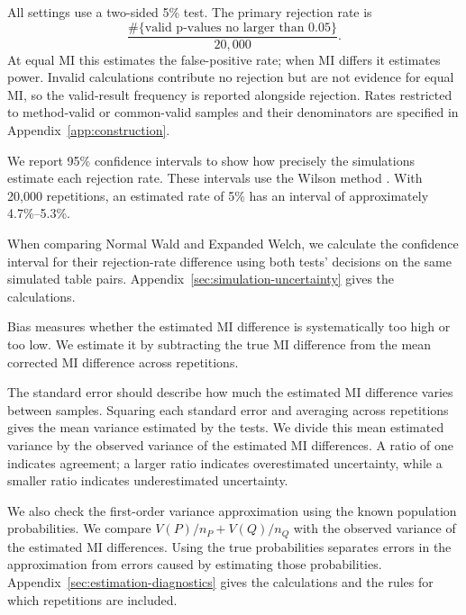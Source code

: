 All settings use a two-sided 5\% test. The primary rejection rate is
\begin{equation}
 \frac{\#\{\text{valid p-values no larger than }0.05\}}{20{,}000}.
 \label{eq:unconditional-rate}
\end{equation}
At equal MI this estimates the false-positive rate; when MI differs it
estimates power. Invalid calculations contribute no rejection but are not
evidence for equal MI, so the valid-result frequency is reported
alongside rejection. Rates restricted to method-valid or common-valid
samples and their denominators are specified in
Appendix~\ref{app:construction}.

We report 95\% confidence intervals to show how precisely the simulations
estimate each rejection rate. These intervals use the Wilson method
\citep{wilson1927}. With 20,000 repetitions, an estimated rate of 5\%
has an interval of approximately 4.7\%--5.3\%.

When comparing Normal Wald and Expanded Welch, we calculate the confidence
interval for their rejection-rate difference using both tests' decisions
on the same simulated table pairs.
Appendix~\ref{sec:simulation-uncertainty} gives the calculations.

\medskip
{}

Bias measures whether the estimated MI difference is systematically too
high or too low. We estimate it by subtracting the true MI difference
from the mean corrected MI difference across repetitions.

The standard error should describe how much the estimated MI difference
varies between samples. Squaring each standard error and averaging across
repetitions gives the mean variance estimated by the tests. We divide
this mean estimated variance by the observed variance of the estimated MI
differences. A ratio of one indicates agreement; a larger ratio indicates
overestimated uncertainty, while a smaller ratio indicates underestimated
uncertainty.

We also check the first-order variance approximation using the known
population probabilities. We compare \(V(P)/n_P+V(Q)/n_Q\) with the
observed variance of the estimated MI differences. Using the true probabilities
separates errors in the approximation from errors caused by estimating
those probabilities. Appendix~\ref{sec:estimation-diagnostics} gives the
calculations and the rules for which repetitions are included.

\medskip
{}

